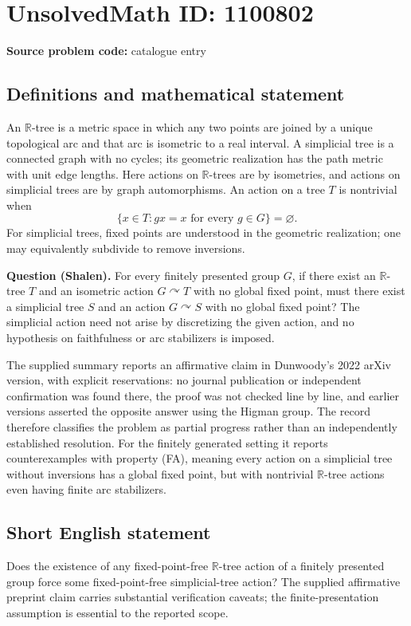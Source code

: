 \documentclass[11pt]{article}
\begin{document}
\section*{UnsolvedMath ID: 1100802}
\textbf{Source problem code:} catalogue entry
\subsection{Definitions and mathematical statement}
An $\mathbb R$-tree is a metric space in which any two points are joined by a unique topological arc and that arc is isometric to a real interval. A simplicial tree is a connected graph with no cycles; its geometric realization has the path metric with unit edge lengths. Here actions on $\mathbb R$-trees are by isometries, and actions on simplicial trees are by graph automorphisms. An action on a tree $T$ is nontrivial when
\[
\{x\in T:gx=x\text{ for every }g\in G\}=\varnothing.
\]
For simplicial trees, fixed points are understood in the geometric realization; one may equivalently subdivide to remove inversions.

\textbf{Question (Shalen).} For every finitely presented group $G$, if there exist an $\mathbb R$-tree $T$ and an isometric action $G\curvearrowright T$ with no global fixed point, must there exist a simplicial tree $S$ and an action $G\curvearrowright S$ with no global fixed point? The simplicial action need not arise by discretizing the given action, and no hypothesis on faithfulness or arc stabilizers is imposed.

The supplied summary reports an affirmative claim in Dunwoody's 2022 arXiv version, with explicit reservations: no journal publication or independent confirmation was found there, the proof was not checked line by line, and earlier versions asserted the opposite answer using the Higman group. The record therefore classifies the problem as partial progress rather than an independently established resolution. For the finitely generated setting it reports counterexamples with property (FA), meaning every action on a simplicial tree without inversions has a global fixed point, but with nontrivial $\mathbb R$-tree actions even having finite arc stabilizers.
\subsection{Short English statement}
Does the existence of any fixed-point-free $\mathbb R$-tree action of a finitely presented group force some fixed-point-free simplicial-tree action? The supplied affirmative preprint claim carries substantial verification caveats; the finite-presentation assumption is essential to the reported scope.
\end{document}
